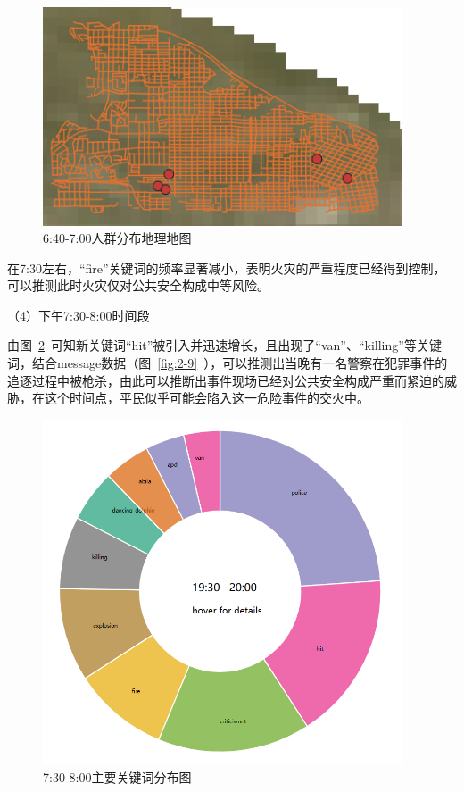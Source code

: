 \documentclass[a4paper]{article}
\begin{document}
\begin{figure}[H]
  \centering
  \includegraphics[width=0.95\textwidth]{images/2-7.png}
  \caption{6:40-7:00人群分布地理地图}\label{fig:2-7}
  \vspace{\baselineskip}
\end{figure}
在7:30左右，“fire”关键词的频率显著减小，表明火灾的严重程度已经得到控制，可以推测此时火灾仅对公共安全构成中等风险。

（4）下午7:30-8:00时间段

由图~\ref{fig:2-8}~可知新关键词“hit”被引入并迅速增长，且出现了“van”、“killing”等关键词，结合message数据（图~\ref{fig:2-9}~），可以推测出当晚有一名警察在犯罪事件的追逐过程中被枪杀，由此可以推断出事件现场已经对公共安全构成严重而紧迫的威胁，在这个时间点，平民似乎可能会陷入这一危险事件的交火中。

\begin{figure}[H]
  \centering
  \includegraphics[width=0.95\textwidth]{images/2-8.png}
  \caption{7:30-8:00主要关键词分布图}\label{fig:2-8}
  \vspace{\baselineskip}
\end{figure}
\end{document}
